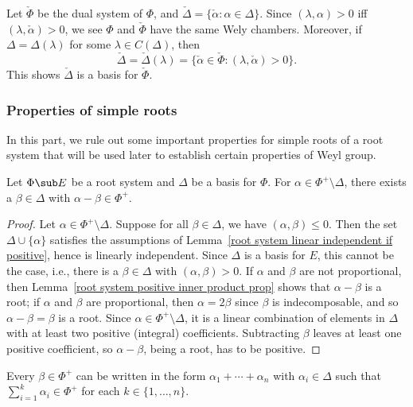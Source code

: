 \begin{example}
Let $\check{\Phi}$ be the dual system of $\Phi$, and $\check{\Delta}=\{\check{\alpha}:\alpha\in\Delta\}$. Since $(\lambda,\alpha)>0$ iff $(\lambda,\check{\alpha})>0$, we see $\Phi$ and $\check{\Phi}$ have the same Wely chambers. Moreover, if $\Delta=\Delta(\lambda)$ for some $\lambda\in C(\Delta)$, then
\[\check{\Delta}=\check{\Delta}(\lambda)=\{\check{\alpha}\in\check{\Phi}:(\lambda,\check{\alpha})>0\}.\]
This shows $\check{\Delta}$ is a basis for $\check{\Phi}$.
\end{example}
\subsubsection{Properties of simple roots}
In this part, we rule out some important properties for simple roots of a root system that will be used later to establish certain properties of Weyl group.
\begin{lemma}\label{root system nonsimple roots substract by simple}
Let $\Phi\sub E$ be a root system and $\Delta$ be a basis for $\Phi$. For $\alpha\in\Phi^+\setminus\Delta$, there exists a $\beta\in\Delta$ with $\alpha-\beta\in\Phi^+$.
\end{lemma}
\begin{proof}
Let $\alpha\in\Phi^+\setminus\Delta$. Suppose for all $\beta\in\Delta$, we have $(\alpha,\beta)\leq 0$. Then the set $\Delta\cup\{\alpha\}$ satisfies the assumptions of Lemma~\ref{root system linear independent if positive}, hence is linearly independent. Since $\Delta$ is a basis for $E$, this cannot be the case, i.e., there is a $\beta\in\Delta$ with $(\alpha,\beta)>0$. If $\alpha$ and $\beta$ are not proportional, then Lemma~\ref{root system positive inner product prop} shows that $\alpha-\beta$ is a root; if $\alpha$ and $\beta$ are proportional, then $\alpha=2\beta$ since $\beta$ is indecomposable, and so $\alpha-\beta=\beta$ is a root. Since $\alpha\in\Phi^+\setminus\Delta$, it is a linear combination of elements in $\Delta$ with at least two positive (integral) coefficients. Subtracting $\beta$ leaves at least one positive coefficient, so $\alpha-\beta$, being a root, has to be positive.
\end{proof}
\begin{corollary}\label{root system successive sum into positive root}
Every $\beta\in\Phi^+$ can be written in the form $\alpha_1+\cdots+\alpha_n$ with $\alpha_i\in\Delta$ such that $\sum_{i=1}^{k}\alpha_i\in\Phi^+$ for each $k\in\{1,\dots,n\}$.
\end{corollary}
